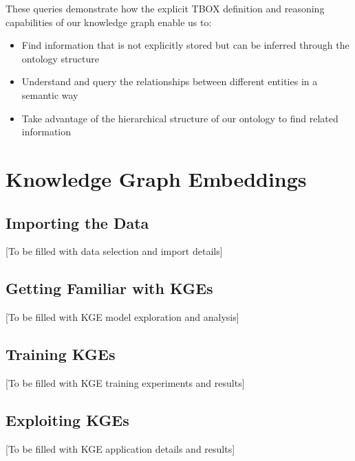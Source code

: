 \documentclass[10pt,a4paper]{article}
\begin{document}
These queries demonstrate how the explicit TBOX definition and reasoning capabilities of our knowledge graph enable us to:
\begin{itemize}
    \item Find information that is not explicitly stored but can be inferred through the ontology structure
    \item Understand and query the relationships between different entities in a semantic way
    \item Take advantage of the hierarchical structure of our ontology to find related information
\end{itemize}

\section{Knowledge Graph Embeddings}
\subsection{Importing the Data}
[To be filled with data selection and import details]

\subsection{Getting Familiar with KGEs}
[To be filled with KGE model exploration and analysis]

\subsection{Training KGEs}
[To be filled with KGE training experiments and results]

\subsection{Exploiting KGEs}
[To be filled with KGE application details and results]
\end{document}
